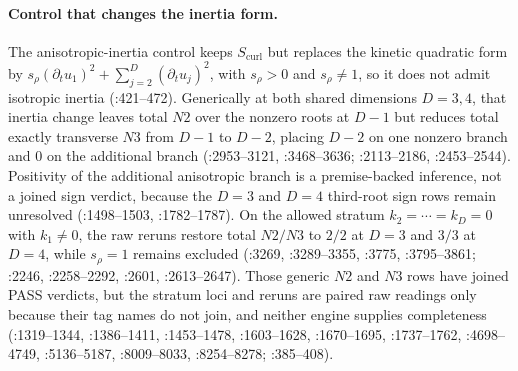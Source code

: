 \paragraph{Control that changes the inertia form.}
The anisotropic-inertia control keeps \(S_{\mathrm{curl}}\) but replaces the
kinetic quadratic form by
\(s_\rho(\partial_tu_1)^2+\sum_{j=2}^{D}(\partial_tu_j)^2\), with
\(s_\rho>0\) and \(s_\rho\ne1\), so it does not admit isotropic inertia
(:421--472).
Generically at both shared dimensions \(D=3,4\), that inertia change leaves
total \(N2\) over the nonzero roots at \(D-1\) but reduces total exactly
transverse \(N3\) from \(D-1\) to \(D-2\), placing \(D-2\) on one nonzero
branch and \(0\) on the additional branch
(:2953--3121,
:3468--3636;
:2113--2186,
:2453--2544).
Positivity of the additional anisotropic branch is a premise-backed inference,
not a joined sign verdict, because the \(D=3\) and \(D=4\) third-root sign rows
remain unresolved
(:1498--1503,
:1782--1787).
On the allowed stratum \(k_2=\cdots=k_D=0\) with \(k_1\ne0\), the raw reruns
restore total \(N2/N3\) to \(2/2\) at \(D=3\) and \(3/3\) at \(D=4\), while
\(s_\rho=1\) remains excluded
(:3269,
:3289--3355, :3775, :3795--3861;
:2246,
:2258--2292, :2601, :2613--2647).
Those generic \(N2\) and \(N3\) rows have joined PASS verdicts, but the stratum
loci and reruns are paired raw readings only because their tag names do not
join, and neither engine supplies completeness
(:1319--1344,
:1386--1411, :1453--1478, :1603--1628, :1670--1695, :1737--1762,
:4698--4749, :5136--5187, :8009--8033, :8254--8278;
:385--408).

